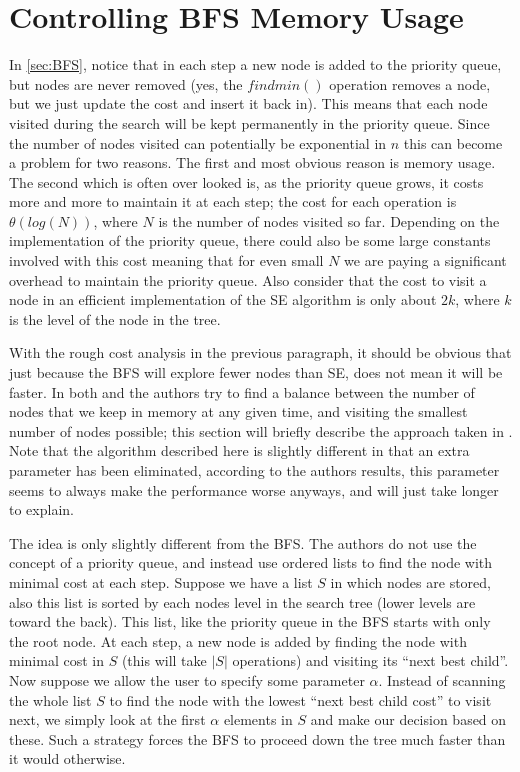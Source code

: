 \documentclass[12pt,Bold,letterpaper]{mcgilletdclass}
\begin{document}
\section{Controlling BFS Memory Usage}

In \ref{sec:BFS}, notice that in each step a new node is added to the priority queue, but nodes are never removed (yes, the $findmin()$ operation removes a node, but we just update the cost and insert it back in). This means that each node visited during the search will be kept permanently in the priority queue. Since the number of nodes visited can potentially be exponential in $n$ this can become a problem for two reasons. The first and most obvious reason is memory usage. The second which is often over looked is, as the priority queue grows, it costs more and more to maintain it at each step; the cost for each operation is $\theta(log(N))$, where $N$ is the number of nodes visited so far. Depending on the implementation of the priority queue, there could also be some large constants involved with this cost meaning that for even small $N$ we are paying a significant overhead to maintain the priority queue. Also consider that the cost to visit a node in an efficient implementation of the SE algorithm is only about $2k$, where $k$ is the level of the node in the tree.

With the rough cost analysis in the previous paragraph, it should be obvious that just because the BFS will explore fewer nodes than SE, does not mean it will be faster. In both \cite{DaiY08} and \cite{StuBF07} the authors try to find a balance between the number of nodes that we keep in memory at any given time, and visiting the smallest number of nodes possible; this section will briefly describe the approach taken in \cite{StuBF07}. Note that the algorithm described here is slightly different in that an extra parameter has been eliminated, according to the authors results, this parameter seems to always make the performance worse anyways, and will just take longer to explain.

The idea is only slightly different from the BFS. The authors do not use the concept of a priority queue, and instead use ordered lists to find the node with minimal cost at each step. Suppose we have a list $S$ in which nodes are stored, also this list is sorted by each nodes level in the search tree (lower levels are toward the back). This list, like the priority queue in the BFS starts with only the root node. At each step, a new node is added by finding the node with minimal cost in $S$ (this will take $|S|$ operations) and visiting its ``next best child''. Now suppose we allow the user to specify some parameter $\alpha$. Instead of scanning the whole list $S$ to find the node with the lowest ``next best child cost'' to visit next, we simply look at the first $\alpha$ elements in $S$ and make our decision based on these. Such a strategy forces the BFS to proceed down the tree much faster than it would otherwise.
\end{document}
